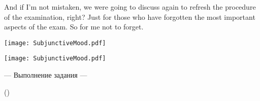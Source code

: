 \documentclass[main.tex]{subfiles}
\begin{document}
And if I'm not mistaken, we were going to discuss again to refresh the procedure of the examination, right?
Just for those who have forgotten the most important aspects of the exam.
So for me not to forget.

\newpage
{}
\label{subsec:subjunctive-mood-lk}
{\parindent-10pt\texttt{[image: SubjunctiveMood.pdf]}}

\vspace{-5.7pt}
{\parindent-10pt\texttt{[image: SubjunctiveMood.pdf]}}

\newpage
{}

\hypertarget{ltask:2024-03-20}{--- Выполнение задания ---} (\hyperref[task:2024-03-20]{\color{blue}{перейти к тексту задания}})
\\

\end{document}
